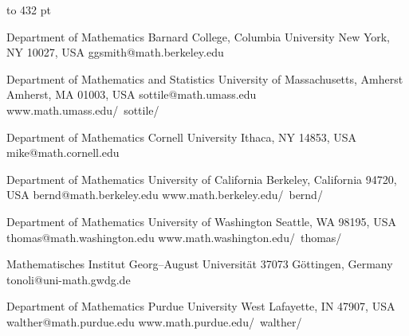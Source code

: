     \vfill\eject

    \vbox to 432 pt {

		Department of Mathematics
		Barnard College, Columbia University
		New York, NY 10027, USA
                ggsmith@math.berkeley.edu
        \endaddr

        \aspace

                Department of Mathematics and Statistics
                University of Massachusetts, Amherst
                Amherst, MA 01003, USA
                sottile@math.umass.edu
                www.math.umass.edu/~sottile/
        \endaddr

        \aspace

                Department of Mathematics
                Cornell University
                Ithaca, NY 14853, USA
                mike@math.cornell.edu
        \endaddr

        \aspace

                Department of Mathematics
                University of California
                Berkeley, California 94720, USA
                bernd@math.berkeley.edu
                www.math.berkeley.edu/~bernd/
        \endaddr

        \aspace

                Department of Mathematics
                University of Washington
                Seattle, WA 98195, USA
                thomas@math.washington.edu
                www.math.washington.edu/~thomas/
        \endaddr

        \aspace

                Mathematisches Institut
                Georg--August Universit\"at
                37073 G\"ottingen, Germany
                tonoli@uni-math.gwdg.de
        \endaddr

        \aspace

                Department of Mathematics
                Purdue University
                West Lafayette, IN 47907, USA
                walther@math.purdue.edu
                www.math.purdue.edu/~walther/
        \endaddr

    }

\egroup
\vfill\eject
\onecolumn


